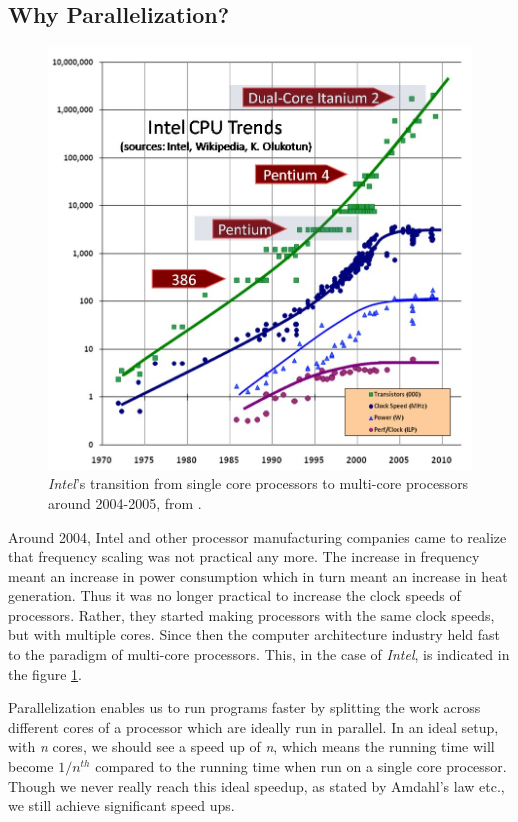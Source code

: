 \documentclass[MTech]{iitmdiss}
\begin{document}
\subsection{Why Parallelization?}
\begin{figure}[h]
    \centering
    \includegraphics[width=\textwidth,scale=0.6,keepaspectratio=true]{CPU-Scaling.jpg}
    \caption{
        \textit{Intel}'s transition from single core processors to multi-core processors around 2004-2005, from \cite{Herb:Intel}.
    }
    \label{fig:intel}
\end{figure}
Around 2004, Intel and other processor manufacturing companies came to realize that frequency scaling was not practical any more. The increase in frequency meant an increase in power consumption which in turn meant an increase in heat generation. Thus it was no longer practical to increase the clock speeds of processors. Rather, they started making processors with the same clock speeds, but with multiple cores. Since then the computer architecture industry held fast to the paradigm of multi-core processors. This, in the case of \textit{Intel}, is indicated in the figure \ref{fig:intel}.

Parallelization enables us to run programs faster by splitting the work across different cores of a processor which are ideally run in parallel. In an ideal setup, with \textit{n} cores, we should see a speed up of \textit{n}, which means the running time will become $1/n^{th}$ compared to the running time when run on a single core processor. Though we never really reach this ideal speedup, as stated by Amdahl's law etc., we still achieve significant speed ups.
\end{document}
